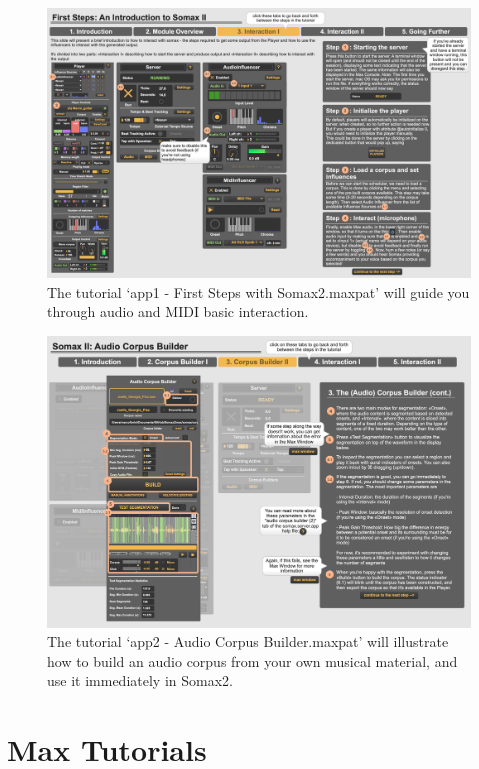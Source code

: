  \begin{figure}[H]
    \centering        
 	\includegraphics[width=1\textwidth]{img/app1_interaction.png}
    \caption{The tutorial `app1 - First Steps with Somax2.maxpat' will guide you through audio and MIDI basic interaction.}
    \label{fig:app1_interaction}
\end{figure}


 \begin{figure}[H]
    \centering        
 	\includegraphics[width=1\textwidth]{img/app2_audiocorpusbuilder.png}
    \caption{The tutorial `app2 - Audio Corpus Builder.maxpat' will illustrate how to build an audio corpus from your own musical material, and use it immediately in Somax2.}
    \label{fig:app2_audiocorpusbuilder}
\end{figure}



\section{Max Tutorials}

